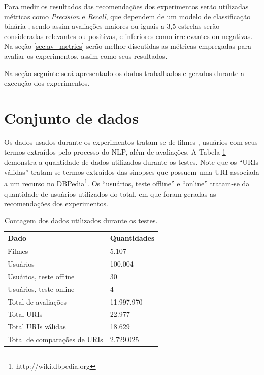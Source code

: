Para medir os resultados das recomendações dos experimentos serão utilizadas métricas como \textit{Precision} e \textit{Recall}, que dependem de um modelo de classificação binária \citep{Powers_2008}, sendo assim avaliações maiores ou iguais a 3,5 estrelas serão consideradas relevantes ou positivas, e inferiores como irrelevantes ou negativas. Na seção \ref{sec:av_metrics} serão melhor discutidas as métricas empregadas para avaliar os experimentos, assim como seus resultados.

Na seção seguinte será apresentado os dados trabalhados e gerados durante a execução dos experimentos.

\section{Conjunto de dados}
\label{sec:av_data_set}

Os dados usados durante os experimentos tratam-se de filmes , usuários com seus termos extraídos pelo processo do \ac{NLP}, além de avaliações. A Tabela \ref{tab:dataset} demonstra a quantidade de dados utilizados durante os testes. Note que os \enquote{URIs válidas} tratam-se termos extraídos das sinopses que possuem uma \ac{URI} associada a um recurso no DBPedia\footnote{http://wiki.dbpedia.org}. Os \enquote{usuários, teste offline} e \enquote{online} tratam-se da quantidade de usuários utilizados do total, em que foram geradas as recomendações dos experimentos.

\begin{table}[H]
\centering
\def\arraystretch{1.3}
\begin{tabular}{|l|l|}
	\hline
	\textbf{Dado}          & \textbf{Quantidades}   \\ \hline
	Filmes                 & 5.107                  \\ \hline
	Usuários               & 100.004                \\ \hline
	Usuários, teste offline & 30					\\ \hline
	Usuários, teste online & 4						\\ \hline
	Total de avaliações       & 11.997.970          \\ \hline
	Total URIs             & 22.977                 \\ \hline
	Total URIs válidas     & 18.629                 \\ \hline
	Total de comparações de URIs & 2.729.025        \\ \hline
\end{tabular}
\caption{Contagem dos dados utilizados durante os testes.}
\label{tab:dataset}
\end{table}

